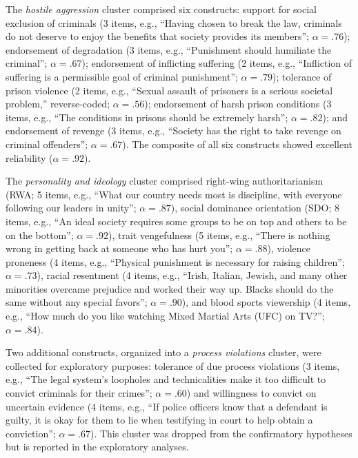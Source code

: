The \textit{hostile aggression} cluster comprised six constructs: support for social exclusion of criminals (3 items, e.g., ``Having chosen to break the law, criminals do not deserve to enjoy the benefits that society provides its members''; $\alpha = .76$); endorsement of degradation (3 items, e.g., ``Punishment should humiliate the criminal''; $\alpha = .67$); endorsement of inflicting suffering (2 items, e.g., ``Infliction of suffering is a permissible goal of criminal punishment''; $\alpha = .79$); tolerance of prison violence (2 items, e.g., ``Sexual assault of prisoners is a serious societal problem,'' reverse-coded; $\alpha = .56$); endorsement of harsh prison conditions (3 items, e.g., ``The conditions in prisons should be extremely harsh''; $\alpha = .82$); and endorsement of revenge (3 items, e.g., ``Society has the right to take revenge on criminal offenders''; $\alpha = .67$). The composite of all six constructs showed excellent reliability ($\alpha = .92$).

The \textit{personality and ideology} cluster comprised right-wing authoritarianism (RWA; 5 items, e.g., ``What our country needs most is discipline, with everyone following our leaders in unity''; $\alpha = .87$), social dominance orientation (SDO; 8 items, e.g., ``An ideal society requires some groups to be on top and others to be on the bottom''; $\alpha = .92$), trait vengefulness (5 items, e.g., ``There is nothing wrong in getting back at someone who has hurt you''; $\alpha = .88$), violence proneness (4 items, e.g., ``Physical punishment is necessary for raising children''; $\alpha = .73$), racial resentment (4 items, e.g., ``Irish, Italian, Jewish, and many other minorities overcame prejudice and worked their way up. Blacks should do the same without any special favors''; $\alpha = .90$), and blood sports viewership (4 items, e.g., ``How much do you like watching Mixed Martial Arts (UFC) on TV?''; $\alpha = .84$).

Two additional constructs, organized into a \textit{process violations} cluster, were collected for exploratory purposes: tolerance of due process violations (3 items, e.g., ``The legal system's loopholes and technicalities make it too difficult to convict criminals for their crimes''; $\alpha = .60$) and willingness to convict on uncertain evidence (4 items, e.g., ``If police officers know that a defendant is guilty, it is okay for them to lie when testifying in court to help obtain a conviction''; $\alpha = .67$). This cluster was dropped from the confirmatory hypotheses but is reported in the exploratory analyses.

